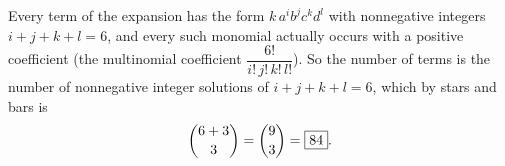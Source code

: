 Every term of the expansion has the form $k\,a^ib^jc^kd^l$ with nonnegative integers $i+j+k+l=6$, and every such monomial actually occurs with a positive coefficient (the multinomial coefficient $\dfrac{6!}{i!\,j!\,k!\,l!}$). So the number of terms is the number of nonnegative integer solutions of $i+j+k+l=6$, which by stars and bars is
\[
\dbinom{6+3}{3}=\dbinom93=\boxed{84}.
\]
